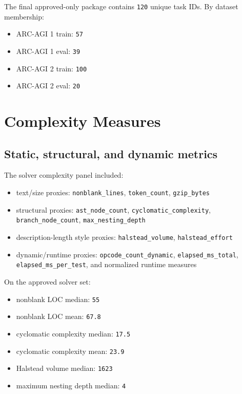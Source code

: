 \documentclass[11pt]{article}
\begin{document}
The final approved-only package contains \texttt{120} unique task IDs. By dataset membership:

\begin{itemize}
  \item ARC-AGI 1 train: \texttt{57}
  \item ARC-AGI 1 eval: \texttt{39}
  \item ARC-AGI 2 train: \texttt{100}
  \item ARC-AGI 2 eval: \texttt{20}
\end{itemize}

\section*{Complexity Measures}

\subsection*{Static, structural, and dynamic metrics}

The solver complexity panel included:

\begin{itemize}
  \item text/size proxies: \texttt{nonblank\_lines}, \texttt{token\_count}, \texttt{gzip\_bytes}
  \item structural proxies: \texttt{ast\_node\_count}, \texttt{cyclomatic\_complexity}, \texttt{branch\_node\_count}, \texttt{max\_nesting\_depth}
  \item description-length style proxies: \texttt{halstead\_volume}, \texttt{halstead\_effort}
  \item dynamic/runtime proxies: \texttt{opcode\_count\_dynamic}, \texttt{elapsed\_ms\_total}, \texttt{elapsed\_ms\_per\_test}, and normalized runtime measures
\end{itemize}

On the approved solver set:

\begin{itemize}
  \item nonblank LOC median: \texttt{55}
  \item nonblank LOC mean: \texttt{67.8}
  \item cyclomatic complexity median: \texttt{17.5}
  \item cyclomatic complexity mean: \texttt{23.9}
  \item Halstead volume median: \texttt{1623}
  \item maximum nesting depth median: \texttt{4}
\end{itemize}
\end{document}
